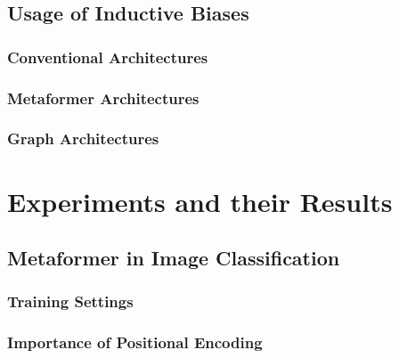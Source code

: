 \documentclass[
headings=optiontohead,              %
12pt,                               %
DIV=13,                             %
twoside=false,                      %
open=right,                         %
BCOR=10mm,                          %
toc=bibliographynumbered            %
]{scrreport}
\begin{document}
    \section{Usage of Inductive Biases}
    \label{sec:biases}
    
        \subsection{Conventional Architectures}
        \label{sec:architectures-biasesnormal}
        
        \FloatBarrier
        \subsection{Metaformer Architectures}
        \label{sec:architectures-biasesmetaformer}
        
        \FloatBarrier
        \subsection{Graph Architectures}
        \label{sec:architectures-biasesgraph}
        
        \FloatBarrier

\chapter{Experiments and their Results}
\label{sec:experiments}
    \section{Metaformer in Image Classification}
    \label{sec:experiments-image-classification}
    
        \subsection{Training Settings}
        \label{sec:experiments-trainingsettings}
        
        \FloatBarrier
        \subsection{Importance of Positional Encoding}
        \label{sec:experiments-positionalencoding}
        
        \FloatBarrier
\end{document}
